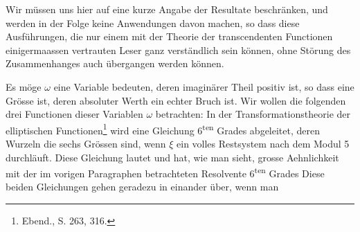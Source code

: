 Wir müssen uns hier auf eine kurze Angabe der Resultate beschränken, und werden in der Folge keine Anwendungen davon machen, so dass diese Ausführungen, die nur einem mit der Theorie der transcendenten Functionen einigermaassen vertrauten Leser ganz verständlich sein können, ohne Störung des Zusammenhanges auch übergangen werden können.

Es möge $\omega$ eine Variable bedeuten, deren imaginärer Theil positiv ist, so dass
eine Grösse ist, deren absoluter Werth ein echter Bruch ist. Wir wollen die folgenden drei Functionen dieser Variablen $\omega$ betrachten:
In der Transformationstheorie der elliptischen Functionen\footnote{Ebend., S. 263, 316.} wird eine Gleichung 6\textsuperscript{ten} Grades abgeleitet, deren Wurzeln die sechs Grössen
sind, wenn $\xi$ ein volles Restsystem nach dem Modul 5 durchläuft. Diese Gleichung lautet
und hat, wie man sieht, grosse Aehnlichkeit mit der im vorigen Paragraphen betrachteten Resolvente 6\textsuperscript{ten} Grades
Diese beiden Gleichungen gehen geradezu in einander über, wenn man
